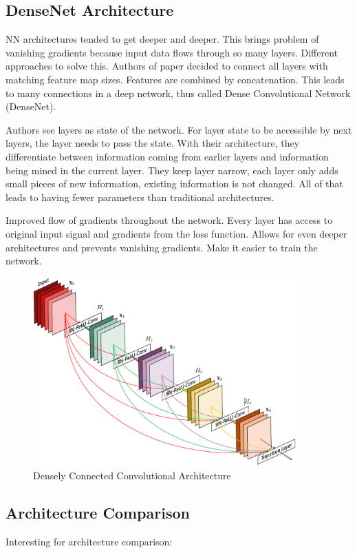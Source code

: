 \subsection{DenseNet Architecture}
\cite{densenet18}
NN architectures tended to get deeper and deeper. This brings problem of vanishing gradients because input data flows through so many layers. Different approaches to solve this. Authors of paper decided to connect all layers with matching feature map sizes. Features are combined by concatenation. This leads to many connections in a deep network, thus called Dense Convolutional Network (DenseNet).

Authors see layers as state of the network. For layer state to be accessible by next layers, the layer needs to pass the state. With their architecture, they differentiate between information coming from earlier layers and information being mined in the current layer. They keep layer narrow, each layer only adds small pieces of new information, existing information is not changed. All of that leads to having fewer parameters than traditional architectures.

Improved flow of gradients throughout the network. Every layer has access to original input signal and gradients from the loss function. Allows for even deeper architectures and prevents vanishing gradients. Make it easier to train the network.


\begin{figure}[h]
    \centering
    \includegraphics[width=0.9\textwidth]{images/dense-net-architecture}
    \caption{Densely Connected Convolutional Architecture \cite{densenet18}}
    \label{fig:densenet_architecture}
\end{figure}

\subsection{Architecture Comparison}
Interesting for architecture comparison: \cite{imseg_architecures}


\newpage